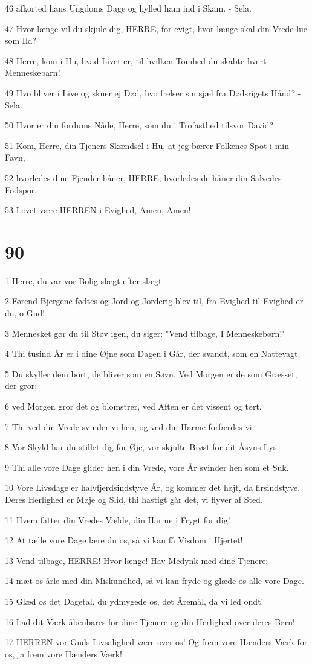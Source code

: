 \par 46 afkorted hans Ungdoms Dage og hylled ham ind i Skam. - Sela.
\par 47 Hvor længe vil du skjule dig, HERRE, for evigt, hvor længe skal din Vrede lue som Ild?
\par 48 Herre, kom i Hu, hvad Livet er, til hvilken Tomhed du skabte hvert Menneskebarn!
\par 49 Hvo bliver i Live og skuer ej Død, hvo frelser sin sjæl fra Dødsrigets Hånd? - Sela.
\par 50 Hvor er din fordums Nåde, Herre, som du i Trofasthed tilsvor David?
\par 51 Kom, Herre, din Tjeners Skændsel i Hu, at jeg bærer Folkenes Spot i min Favn,
\par 52 hvorledes dine Fjender håner, HERRE, hvorledes de håner din Salvedes Fodspor.
\par 53 Lovet være HERREN i Evighed, Amen, Amen!

\chapter{90}

\par 1 Herre, du var vor Bolig slægt efter slægt.
\par 2 Førend Bjergene fødtes og Jord og Jorderig blev til, fra Evighed til Evighed er du, o Gud!
\par 3 Mennesket gør du til Støv igen, du siger: "Vend tilbage, I Menneskebørn!"
\par 4 Thi tusind År er i dine Øjne som Dagen i Går, der svandt, som en Nattevagt.
\par 5 Du skyller dem bort, de bliver som en Søvn. Ved Morgen er de som Græsset, der gror;
\par 6 ved Morgen gror det og blomstrer, ved Aften er det vissent og tørt.
\par 7 Thi ved din Vrede svinder vi hen, og ved din Harme forfærdes vi.
\par 8 Vor Skyld har du stillet dig for Øje, vor skjulte Brøst for dit Åsyns Lys.
\par 9 Thi alle vore Dage glider hen i din Vrede, vore År svinder hen som et Suk.
\par 10 Vore Livsdage er halvfjerdsindstyve År, og kommer det højt, da firsindstyve. Deres Herlighed er Møje og Slid, thi hastigt går det, vi flyver af Sted.
\par 11 Hvem fatter din Vredes Vælde, din Harme i Frygt for dig!
\par 12 At tælle vore Dage lære du os, så vi kan få Visdom i Hjertet!
\par 13 Vend tilbage, HERRE! Hvor længe! Hav Medynk med dine Tjenere;
\par 14 mæt os årle med din Miskundhed, så vi kan fryde og glæde os alle vore Dage.
\par 15 Glæd os det Dagetal, du ydmygede os, det Åremål, da vi led ondt!
\par 16 Lad dit Værk åbenbares for dine Tjenere og din Herlighed over deres Børn!
\par 17 HERREN vor Guds Livsalighed være over os! Og frem vore Hænders Værk for os, ja frem vore Hænders Værk!

